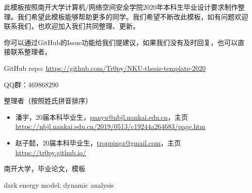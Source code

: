 

\begin{zhaiyao}
\begin{spacing}{1.5}
{


此模板按照南开大学计算机/网络空间安全学院2020年本科生毕业设计要求制作整理。我们希望此模板能够帮助更多的同学。我们希望不断改此模板，如有问题欢迎联系我们，也欢迎加入我们共同整理、更新。

你可以通过GitHub的Issue功能给我们提建议，如果我们没有及时回复，也可以直接联系整理者。

GitHub repo: \url{https://github.com/Tr0py/NKU-thesis-template-2020}

QQ群：469868290

整理者（按照姓氏拼音排序）
\begin{itemize}
    \item 潘宇，20届本科毕业生，\url{panyu@nbjl.nankai.edu.cn}，主页\url{https://nbjl.nankai.edu.cn/2019/0513/c19244a264683/page.htm}
    \item 赵子懿，20届本科毕业生，\url{troppingz@gmail.com}，主页\url{https://tr0py.github.io/}
\end{itemize}
}

\end{spacing}
\end{zhaiyao}




\begin{guanjianci}
南开大学，毕业论文，模板
\end{guanjianci}



\begin{abstract}
\begin{spacing}{1.5}
Since 1998, two independent supernova research groups have discovered that the universe is accelerating, and the dark energy has become a hot topic in cosmology. 

\end{spacing}
\end{abstract}


\begin{keywords}
dark energy model; dynamic analysis
\end{keywords} 